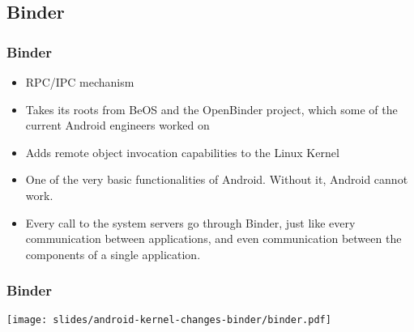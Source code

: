 \subsection{Binder}
\begin{frame}
  \frametitle{Binder}
  \begin{itemize}
  \item RPC/IPC mechanism
  \item Takes its roots from BeOS and the OpenBinder project, which
    some of the current Android engineers worked on
  \item Adds remote object invocation capabilities to the Linux Kernel
  \item One of the very basic functionalities of Android. Without it,
    Android cannot work.
  \item Every call to the system servers go through Binder, just like
    every communication between applications, and even communication
    between the components of a single application.
  \end{itemize}
\end{frame}

\begin{frame}
  \frametitle{Binder}
  \begin{center}
    \texttt{[image: slides/android-kernel-changes-binder/binder.pdf]}
  \end{center}
\end{frame}
